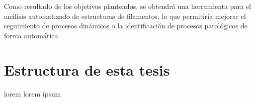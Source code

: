 \begin{intro}

Como resultado de los objetivos planteados, se obtendr\'a una herramienta para el an\'alisis automatizado de estructuras de filamentos, lo que permitir\'ia mejorar el seguimiento de procesos din\'amicos o la identificaci\'on de procesos patol\'ogicos de forma autom\'atica.

\section*{Estructura de esta tesis}
lorem lorem ipsum

\end{intro}